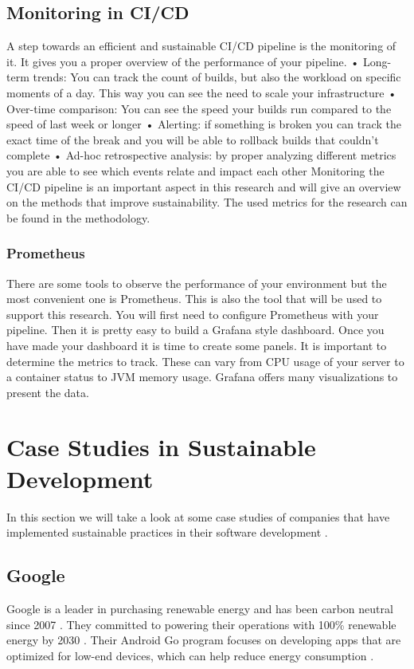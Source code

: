 \subsection{Monitoring in CI/CD}
A step towards an efficient and sustainable CI/CD pipeline is the monitoring of it. It gives you a proper overview of the performance of your pipeline. 
•	Long-term trends: You can track the count of builds, but also the workload on specific moments of a day. This way you can see the need to scale your infrastructure
•	Over-time comparison: You can see the speed your builds run compared to the speed of last week or longer
•	Alerting: if something is broken you can track the exact time of the break and you will be able to rollback builds that couldn’t complete
•	Ad-hoc retrospective analysis: by proper analyzing different metrics you are able to see which events relate and impact each other
Monitoring the CI/CD pipeline is an important aspect in this research and will give an overview on the methods that improve sustainability. The used metrics for the research can be found in the methodology.

\subsubsection{Prometheus}
There are some tools to observe the performance of your environment but the most convenient one is Prometheus. This is also the tool that will be used to support this research. You will first need to configure Prometheus with your pipeline. Then it is pretty easy to build a Grafana style dashboard. Once you have made your dashboard it is time to create some panels. It is important to determine the metrics to track. These can vary from CPU usage of your server to a container status to JVM memory usage. Grafana offers many visualizations to present the data.
\cite{MetricFire2023}



\section{Case Studies in Sustainable Development}
In this section we will take a look at some case studies of companies that have implemented sustainable practices in their software development \autocite{Corewave2023}.


\subsection{Google}
Google is a leader in purchasing renewable energy and has been carbon neutral since 2007 \autocite{Pichai2020}. They committed to powering their operations with 100\% renewable energy by 2030 \autocite{PetersonCorio2022}.
Their Android Go program focuses on developing apps that are optimized for low-end devices, which can help reduce energy consumption \autocite{Corewave2023}.



